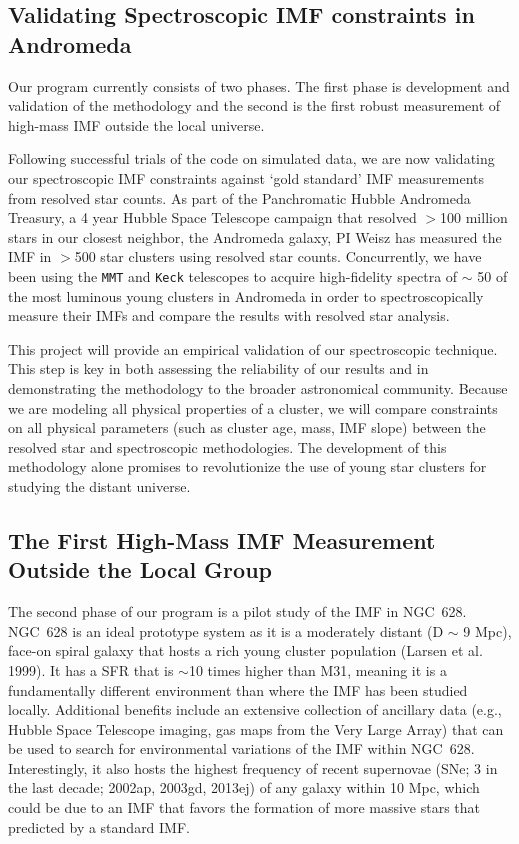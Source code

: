 \documentclass[11pt,preprint]{aastex}
\begin{document}
\subsection{Validating Spectroscopic IMF constraints in Andromeda}

Our program currently consists of two phases.  The first phase is development and validation of the methodology and the second is the first robust measurement of high-mass IMF outside the local universe.

Following successful trials of the code on simulated data, we are now validating our spectroscopic IMF constraints against `gold standard' IMF measurements from resolved star counts.  As part of the Panchromatic Hubble Andromeda Treasury, a 4 year Hubble Space Telescope campaign that resolved $>$100 million stars in our closest neighbor, the Andromeda galaxy, PI Weisz has measured the IMF in $>$500 star clusters using resolved star counts.  Concurrently, we have been using the \texttt{MMT} and \texttt{Keck} telescopes to acquire high-fidelity spectra of $\sim$ 50 of the most luminous young clusters in Andromeda in order to spectroscopically measure their IMFs and compare the results with resolved star analysis.  

This project will provide an empirical validation of our spectroscopic technique.  This step is key in both assessing the reliability of our results and in demonstrating the methodology to the broader astronomical community.  Because we are modeling all physical properties of a cluster, we will compare constraints on all physical parameters (such as cluster age, mass, IMF slope) between the resolved star and spectroscopic  methodologies.  The development of this methodology alone promises to revolutionize the use of young star clusters for studying the distant universe.

\subsection{The First High-Mass IMF Measurement Outside the Local Group}

The second phase of our program is a pilot study of the IMF in NGC~628.  NGC~628 is an ideal prototype system as it is a moderately distant (D $\sim$ 9 Mpc), face-on spiral galaxy that hosts a rich young cluster population (Larsen et al. 1999).  It has a SFR that is $\sim$10 times higher than M31, meaning it is a fundamentally different environment than where the IMF has been studied locally.  Additional benefits include an extensive collection of ancillary data (e.g., Hubble Space Telescope imaging, gas maps from the Very Large Array) that can be used to search for environmental variations of the IMF within NGC~628. Interestingly, it also hosts the highest frequency of recent supernovae (SNe; 3 in the last decade;  2002ap, 2003gd, 2013ej) of any galaxy within 10 Mpc, which could be due to an IMF that favors the formation of more massive stars that predicted by a standard IMF.
\end{document}
